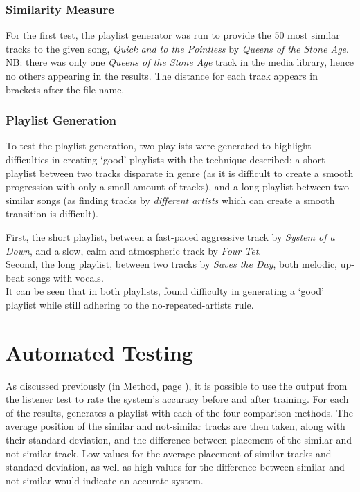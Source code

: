\subsubsection{Similarity Measure}
For the first test, the playlist generator was run to provide the 50 most similar tracks to the given song, \emph{Quick and to the Pointless} by \emph{Queens of the Stone Age}. NB: there was only one \emph{Queens of the Stone Age} track in the media library, hence no others appearing in the results. The distance for each track appears in brackets after the file name.\\

\subsubsection{Playlist Generation}
To test the playlist generation, two playlists were generated to highlight difficulties in creating `good' playlists with the technique described: a short playlist between two tracks disparate in genre (as it is difficult to create a smooth progression with only a small amount of tracks), and a long playlist between two similar songs (as finding tracks by \emph{different artists} which can create a smooth transition is difficult).

First, the short playlist, between a fast-paced aggressive track by \emph{System of a Down}, and a slow, calm and atmospheric track by \emph{Four Tet}.\\

Second, the long playlist, between two tracks by \emph{Saves the Day}, both melodic, up-beat songs with vocals.\\

It can be seen that in both playlists,  found difficulty in generating a `good' playlist while still adhering to the no-repeated-artists rule.
\pagebreak
\section{Automated Testing}
As discussed previously (in Method, page \pageref{text:method:weight_optimisation}), it is possible to use the output from the listener test to rate the system's accuracy before and after training. For each of the results,  generates a playlist with each of the four comparison methods. The average position of the similar and not-similar tracks are then taken, along with their standard deviation, and the difference between placement of the similar and not-similar track. Low values for the average placement of similar tracks and standard deviation, as well as high values for the difference between similar and not-similar would indicate an accurate system.
